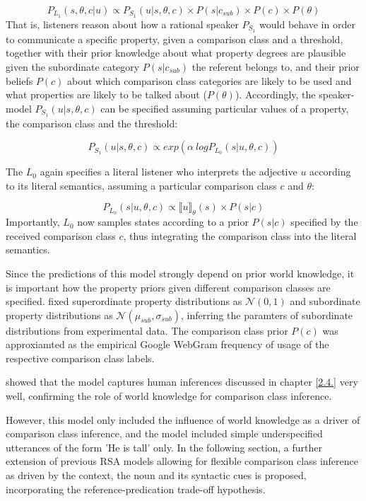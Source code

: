 $$P_{L_1}(s, \theta, c | u) \propto P_{S_1} ( u | s, \theta, c) \times P(s | c_{sub}) \times P(c) \times P(\theta)$$  
That is, listeners reason about how a rational speaker $P_{S_1}$ would behave in order to communicate a specific property, given a comparison class and a threshold, together with their prior knowledge about what property degrees are plausible given the subordinate category $P(s | c _{sub})$ the referent belongs to, and their prior beliefs $P(c)$ about which comparison class categories are likely to be used and what properties are likely to be talked about ($P(\theta)$). Accordingly, the speaker-model $P_{S_1}( u | s, \theta, c)$ can be specified assuming particular values of a property, the comparison class and the threshold:

$$P_{S_1}( u | s, \theta, c) \propto exp(\alpha \: log P_{L_0} (s | u, \theta, c))$$

The $L_0$ again specifies a literal listener who interprets the adjective $u$ according to its literal semantics, assuming a particular comparison class $c$ and $\theta$:

$$P_{L_0}(s | u, \theta, c) \propto \llbracket u \rrbracket_{\theta} (s) \times P( s | c)$$  
Importantly, $L_0$ now samples states according to a prior $P(s|c)$ specified by the received comparison class $c$, thus integrating the comparison class into the literal semantics. 

Since the predictions of this model strongly depend on prior world knowledge, it is important how the property priors given different comparison classes are specified. \textcite{tessler2017warm} fixed superordinate property distributions as $\mathcal{N} (0, 1)$ and subordinate property distributions as $\mathcal{N}(\mu_{sub}, \sigma_{sub})$, inferring the paramters of subordinate distributions from experimental data. The comparison class prior $P(c)$ was approxiamted as the empirical Google WebGram frequency of usage of the respective comparison class labels. 

\textcite{tessler2017warm} showed that the model captures human inferences discussed in chapter \ref{2.4.} very well, confirming the role of world knowledge for comparison class inference. 

However, this model only included the influence of world knowledge as a driver of comparison class inference, and the model included simple underspecified utterances of the form 'He is tall' only. In the following section, a further extension of previous RSA models allowing for flexible comparison class inference as driven by the context, the noun and its syntactic cues is proposed, incorporating the reference-predication trade-off hypothesis. 

